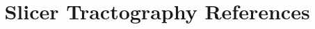 \documentclass[a4paper]{article}
\title{Slicer Tractography References}
\begin{document}
\maketitle
\nocite{*}

\end{document}
